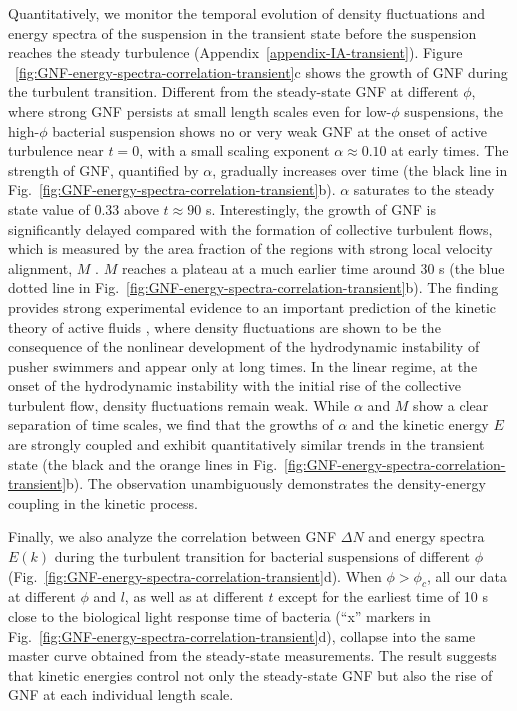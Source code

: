\documentclass[twocolumn,aps,prx,amsmath,amssymb,longbibliography,superscriptaddress]{revtex4-2}
\begin{document}
Quantitatively, we monitor the temporal evolution of density fluctuations and energy spectra of the suspension in the transient state before the suspension reaches the steady turbulence (Appendix~\ref{appendix-IA-transient}). Figure ~\ref{fig:GNF-energy-spectra-correlation-transient}c shows the growth of GNF during the turbulent transition. Different from the steady-state GNF at different $\phi$, where strong GNF persists at small length scales even for low-$\phi$ suspensions, the high-$\phi$ bacterial suspension shows no or very weak GNF at the onset of active turbulence near $t=0$, with a small scaling exponent $\alpha \approx 0.10$ at early times. The strength of GNF, quantified by $\alpha$, gradually increases over time (the black line in Fig.~\ref{fig:GNF-energy-spectra-correlation-transient}b). $\alpha$ saturates to the steady state value of 0.33 above $t \approx 90$ s. Interestingly, the growth of GNF is significantly delayed compared with the formation of collective turbulent flows, which is measured by the area fraction of the regions with strong local velocity alignment, $M$ \cite{Cisneros2011, Peng2020}. $M$ reaches a plateau at a much earlier time around 30 s (the blue dotted line in Fig.~\ref{fig:GNF-energy-spectra-correlation-transient}b). The finding provides strong experimental evidence to an important prediction of the kinetic theory of active fluids \cite{Saintillan2008a, Saintillan2008b}, where density fluctuations are shown to be the consequence of the nonlinear development of the hydrodynamic instability of pusher swimmers and appear only at long times. In the linear regime, at the onset of the hydrodynamic instability with the initial rise of the collective turbulent flow, density fluctuations remain weak. While $\alpha$ and $M$ show a clear separation of time scales, we find that the growths of $\alpha$ and the kinetic energy $E$ are strongly coupled and exhibit quantitatively similar trends in the transient state (the black and the orange lines in Fig.~\ref{fig:GNF-energy-spectra-correlation-transient}b). The observation unambiguously demonstrates the density-energy coupling in the kinetic process.

Finally, we also analyze the correlation between GNF $\Delta N$ and energy spectra $E(k)$ during the turbulent transition for bacterial suspensions of different $\phi$ (Fig.~\ref{fig:GNF-energy-spectra-correlation-transient}d). When $\phi>\phi_c$, all our data at different $\phi$ and $l$, as well as at different $t$ except for the earliest time of 10 s close to the biological light response time of bacteria (``x'' markers in Fig.~\ref{fig:GNF-energy-spectra-correlation-transient}d), collapse into the same master curve obtained from the steady-state measurements.
The result suggests that kinetic energies control not only the steady-state GNF but also the rise of GNF at each individual length scale.
\end{document}
